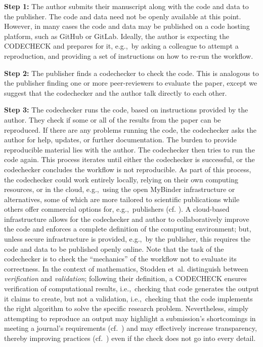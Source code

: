 \documentclass[12pt]{article}
\begin{document}
\textbf{Step 1:} The author submits their manuscript along with the
code and data to the publisher.  The code and data need not be openly
available at this point.  However, in many cases the code and data may
be published on a code hosting platform, such as GitHub or
GitLab. Ideally, the author is expecting the CODECHECK and prepares
for it, e.g.,~by asking a colleague to attempt a reproduction, and
providing a set of instructions on how to re-run the workflow.

\textbf{Step 2:} The publisher finds a codechecker to check the
code. This is analogous to the publisher finding one or more
peer-reviewers to evaluate the paper, except we suggest that the
codechecker and the author talk directly to each other.

\textbf{Step 3:} The codechecker runs the code, based on instructions
provided by the author. They check if some or all of the results from
the paper can be reproduced. If there are any problems running the
code, the codechecker asks the author for help, updates, or further
documentation.  The burden to provide reproducible material lies with
the author.  The codechecker then tries to run the code again.  This
process iterates until either the codechecker is successful, or the
codechecker concludes the workflow is not reproducible.  As part of
this process, the codechecker could work entirely locally, relying on
their own computing resources, or in the cloud, e.g.,~using the open
MyBinder infrastructure \cite{jupyter_binder_2018} or alternatives,
some of which are more tailored to scientific publications while
others offer commercial options for, e.g.,~publishers
(cf. \cite{konkol_publishing_2020}).  A cloud-based infrastructure
allows for the codechecker and author to collaboratively improve the
code and enforces a complete definition of the computing environment;
but, unless secure infrastructure is provided, e.g.,~by the publisher,
this requires the code and data to be published openly online.  Note
that the task of the codechecker is to check the ``mechanics'' of the
workflow not to evaluate its correctness.  In the context of
mathematics, Stodden et~al. \cite{stodden_setting_2013} distinguish
between \emph{verification} and \emph{validation}; following their
definition, a CODECHECK ensures verification
of computational results, i.e.,~checking that code generates the
output it claims to create, but not a validation, i.e.,~checking that
the code implements the right algorithm to solve the specific research
problem.  Nevertheless, simply attempting to reproduce an output may
highlight a submission's shortcomings in meeting a journal's
requirements (cf.~\cite{christian_journal_2020}) and may effectively
increase transparency, thereby improving practices
(cf.~\cite{nosek_scientific_2012}) even if the check does not go into
every detail.
\end{document}
